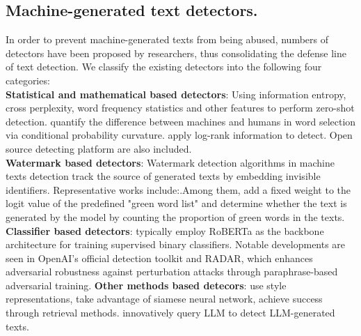 \documentclass[11pt]{article}
\newcommand{\greenCite}[1]{\textcolor{darkgreen}{\cite{#1}}}
\newcommand{\greenCitep}[1]{\textcolor{darkgreen}{\citep{#1}}}
\begin{document}
	\subsection{Machine-generated text detectors.}
	In order to prevent machine-generated texts from being abused, numbers of detectors have been proposed by researchers, thus consolidating the defense line of text detection. We classify the existing detectors into the following four categories:\\
	\textbf{Statistical and mathematical based detectors}: Using information entropy, cross perplexity, word frequency statistics and other features to perform zero-shot detection.\greenCite{mitchell2023detectgpt} quantify the difference between machines and humans in word selection via conditional probability curvature.\greenCite{su2023detectllm} apply log-rank information to detect. Open source detecting platform \greenCite{tian2023gptzero,gehrmann2019gltrstatisticaldetectionvisualization} are also included.\\
	\textbf{Watermark based detectors}: Watermark detection algorithms in machine texts detection track the source of generated texts by embedding invisible identifiers. Representative works include:\greenCite{gu2022watermarking,liu2024unforgeablepubliclyverifiablewatermark,hou2024clusteringbasedsemanticwatermark,lu2024entropybasedwatermarking}.Among them,\greenCite{kirchenbauer2023watermark} add a fixed weight to the logit value of the predefined "green word list" and determine whether the text is generated by the model by counting the proportion of green words in the texts.\\
	\textbf{Classifier based detectors}:\greenCite{Chen_2023,miao2024efficientdetection,mireshghallah2024smallerlanguagemodelsbetter,wang2023seqxgpt,liu2024checkgpt} typically employ RoBERTa\greenCitep{liu2019roberta} as the backbone architecture for training supervised binary classifiers. Notable developments are seen in OpenAI's official detection toolkit\greenCitep{solaiman2019releasestrategiessocialimpacts} and RADAR\greenCitep{hu2023radarrobustaitextdetection}, which enhances adversarial robustness against perturbation attacks through paraphrase-based adversarial training.
	\textbf{Other methods based detecors}:\greenCite{soto2024fewshotdetectionmachinegeneratedtext} use style representations,\greenCite{huang2024ai} take advantage of siamese neural network,\greenCite{krishna2024paraphrasing} achieve success through retrieval methods.\greenCite{zhu2023beatllm} innovatively query LLM to detect LLM-generated texts.
	
\end{document}
